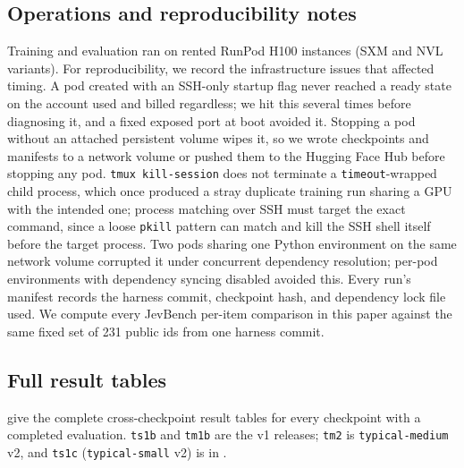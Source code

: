 \subsection{Operations and reproducibility notes}
\label{app:ops}

Training and evaluation ran on rented RunPod H100 instances (SXM and NVL variants). For reproducibility, we
record the infrastructure issues that affected timing. A pod created with an SSH-only startup flag never reached a
ready state on the account used and billed regardless; we hit this several times before diagnosing it,
and a fixed exposed port at boot avoided it. Stopping a pod without an attached persistent volume wipes
it, so we wrote checkpoints and manifests to a network volume or pushed them to the Hugging Face Hub
before stopping any pod. \texttt{tmux kill-session} does not terminate a
\texttt{timeout}-wrapped child process, which once produced a stray duplicate training run sharing a GPU
with the intended one; process matching over SSH must target the exact command, since a loose
\texttt{pkill} pattern can match and kill the SSH shell itself before the target process. Two pods sharing
one Python environment on the same network volume corrupted it under concurrent dependency resolution;
per-pod environments with dependency syncing disabled avoided this. Every run's manifest records the
harness commit, checkpoint hash, and dependency lock file used. We compute every JevBench per-item
comparison in this paper against the same fixed set of 231 public ids from one harness commit.

\subsection{Full result tables}
\label{app:full-results}

 give the
complete cross-checkpoint result tables for every checkpoint with a completed evaluation. \texttt{ts1b}
and \texttt{tm1b} are the v1 releases; \texttt{tm2} is \texttt{typical-medium} v2, and \texttt{ts1c}
(\texttt{typical-small} v2) is in .

